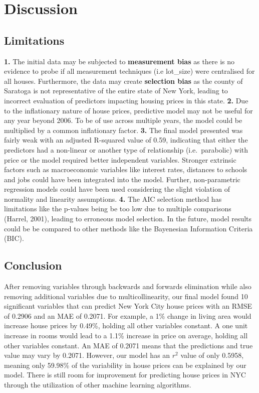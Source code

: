 \documentclass[letterpaper,8pt,twocolumn,twoside,]{pinp}
\begin{document}
\section{Discussion}\label{discussion}

\subsection{Limitations}\label{limitations}

\textbf{1.} The initial data may be subjected to \textbf{measurement
bias} as there is no evidence to probe if all measurement techniques
(i.e lot\_size) were centralised for all houses. Furthermore, the data
may create \textbf{selection bias} as the county of Saratoga is not
representative of the entire state of New York, leading to incorrect
evaluation of predictors impacting housing prices in this state.
\textbf{2.} Due to the inflationary nature of house prices, predictive
model may not be useful for any year beyond 2006. To be of use across
multiple years, the model could be multiplied by a common inflationary
factor. \textbf{3.} The final model presented was fairly weak with an
adjusted R-squared value of 0.59, indicating that either the predictors
had a non-linear or another type of relationship (i.e.~parabolic) with
price or the model required better independent variables. Stronger
extrinsic factors such as macroeconomic variables like interest rates,
distances to schools and jobs could have been integrated into the model.
Further, non-parametric regression models could have been used
considering the slight violation of normality and linearity assumptions.
\textbf{4.} The AIC selection method has limitations like the p-values
being be too low due to multiple comparisons (Harrel, 2001), leading to
erroneous model selection. In the future, model results could be be
compared to other methods like the Bayenesian Information Criteria
(BIC).

\subsection{Conclusion}\label{conclusion}

After removing variables through backwards and forwards elimination
while also removing additional variables due to multicollinearity, our
final model found 10 significant variables that can predict New York
City house prices with an RMSE of 0.2906 and an MAE of 0.2071. For
example, a 1\% change in living area would increase house prices by
0.49\%, holding all other variables constant. A one unit increase in
rooms would lead to a 1.1\% increase in price on average, holding all
other variables constant. An MAE of 0.2071 means that the predictions
and true value may vary by 0.2071. However, our model has an \(r^2\)
value of only 0.5958, meaning only 59.98\% of the variability in house
prices can be explained by our model. There is still room for
improvement for predicting house prices in NYC through the utilization
of other machine learning algorithms.
\end{document}
